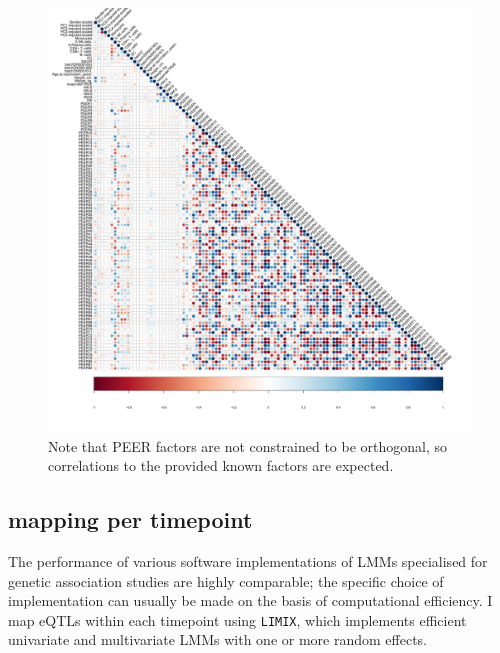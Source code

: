 \begin{figure}
    \centering
    \includegraphics[width=1.0\textwidth,page=1]{mainmatter/figures/chapter_03/peer_mega/peer.factor_cor_matrix.v2.pdf}
    \caption{Note that PEER factors are not constrained to be orthogonal, so correlations to the provided known factors are expected.}
    \label{fig:hird_peer_corMatrix_v2_mega}
\end{figure}

\subsection{ mapping per timepoint}

%
The performance of various software implementations of \glspl{LMM} specialised for genetic association studies are highly comparable; 
the specific choice of implementation can usually be made on the basis of computational efficiency\autocite{eu-ahsunthornwattana2014ComparisonMethodsAccount}.
I map \glspl{eQTL} within each timepoint using \texttt{LIMIX}\autocite{lippert2014LIMIXGeneticAnalysis}, which implements efficient univariate and multivariate \glspl{LMM} with one or more random effects.

